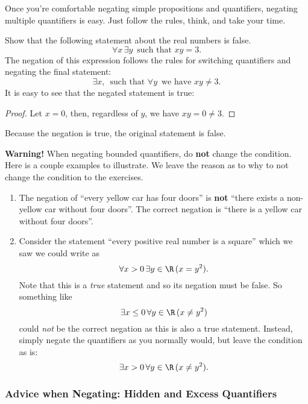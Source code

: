 Once you're comfortable negating simple propositions and quantifiers, negating multiple quantifiers is easy. Just follow the rules, think, and take your time.

\begin{example}
Show that the following statement about the real numbers is false.
\[\forall x \, \exists y \, \text{ such that }xy=3.\]
The negation of this expression follows the rules for switching quantifiers and negating the final statement:
\[\exists x,\, \text{ such that }\forall y \, \text{ we have }xy\neq 3.\]
It is easy to see that the negated statement is true:
\begin{proof}
Let $x=0$, then, regardless of $y$, we have $xy=0\neq 3$.
\end{proof}

\noindent Because the negation is true, the original statement is false.
\end{example}

\noindent \textbf{Warning!} When negating bounded quantifiers, do \textbf{not} change the condition. Here is a couple examples to illustrate. We leave the reason as to why to not change the condition to the exercises.

\begin{example}
\begin{enumerate}
    \item The negation of ``every yellow car has four doors'' is \textbf{not} ``there exists a non-yellow car without four doors''. The correct negation is ``there is a yellow car without four doors''. 
    
    \item Consider the statement ``every positive real number is a square'' which we saw we could write as 
    \[
        \forall x > 0 \, \exists y \in \R \, (x = y^2).
    \]
    Note that this is a \emph{true} statement and so its negation must be false. So something like 
    \[
        \exists x \leq 0 \, \forall y \in \R \, (x \neq y^2)
    \]
    could \emph{not} be the correct negation as this is also a true statement. Instead, simply negate the quantifiers as you normally would, but leave the condition as is:
    \[
        \exists x > 0 \, \forall y \in \R \, (x \neq y^2).
    \]
\end{enumerate}
\end{example}

\subsubsection*{Advice when Negating: Hidden and Excess Quantifiers}

